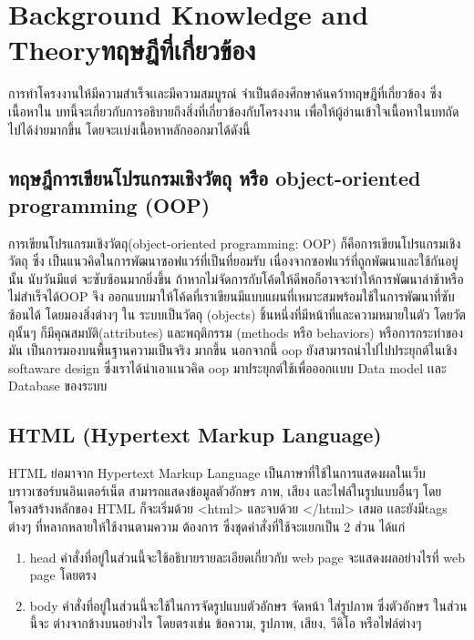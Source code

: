 \chapter{\ifenglish Background Knowledge and Theory\else ทฤษฎีที่เกี่ยวข้อง\fi}

การทําโครงงานให้มีความสําเร็จเเละมีความสมบูรณ์ จําเป็นต้องศึกษาค้นคว้าทฤษฎีที่เกี่ยวข้อง ซึ่งเนื้อหาใน
บทนี้จะเกี่ยวกับการอธิบายถึงสิ่งที่เกี่ยวข้องกับโครงงาน เพื่อให้ผู้อ่านเข้าใจเนื้อหาในบทถัดไปได้ง่ายมากขึ้น
โดยจะเเบ่งเนื้อหาหลักออกมาได้ดังนี้

\section{ทฤษฎีการเขียนโปรแกรมเชิงวัตถุ หรือ object-oriented programming (OOP)}
การเขียนโปรแกรมเชิงวัตถุ(object-oriented programming: OOP) ก็คือการเขียนโปรแกรมเชิงวัตถุ ซึ่ง
เป็นแนวคิดในการพัฒนาซอฟแวร์ที่เป็นที่ยอมรับ เนื่องจากซอฟแวร์ที่ถูกพัฒนาและใช้กันอยู่นั้น นับวันมีแต่
จะซับซ้อนมากยิ่งขึ้น ถ้าหากไม่จัดการกับโค้ดให้ดีพอก็อาจจะทําให้การพัฒนาล่าช้าหรือไม่สําเร็จได้OOP จึง
ออกแบบมาให้โค้ดที่เราเขียนมีแบบแผนที่เหมาะสมพร้อมใช้ในการพัฒนาที่ซับซ้อนได้ โดยมองสิ่งต่างๆ ใน
ระบบเป็นวัตถุ (objects) ชิ้นหนึ่งที่มีหน้าที่และความหมายในตัว โดยวัตถุนั้นๆ ก็มีคุณสมบัติ(attributes)
และพฤติกรรม (methods หรือ behaviors) หรือการกระทําของมัน เป็นการมองบนพื้นฐานความเป็นจริง
มากขึ้น นอกจากนี้ oop\cite{oop} ยังสามารถนําไปไปประยุกต์ในเชิง softaware design ซึ่งเราได้นําเอาเเนวคิด oop มาประยุกต์ใช้เพื่อออกเเบบ Data model เเละ Database ของระบบ

\section{HTML (Hypertext Markup Language)}
HTML\cite{html} ย่อมาจาก Hypertext Markup Language เป็นภาษาที่ใช้ในการแสดงผลในเว็บบราวเซอร์บนอินเตอร์เน็ต สามารถแสดงข้อมูลตัวอักษร ภาพ, เสียง และไฟล์ในรูปแบบอื่นๆ โดยโครงสร้างหลักของ HTML
ก็จะเริ่มด้วย <html> และจบด้วย </html> เสมอ เเละยังมีtags ต่างๆ ที่หลากหลายให้ใช้งานตามความ
ต้องการ ซึ่งชุดคําสั่งที่ใช้จะแยกเป็น 2 ส่วน ได้แก่
\begin{enumerate}
  \item head คําสั่งที่อยู่ในส่วนนี้จะใช้อธิบายรายละเอียดเกี่ยวกับ web page จะแสดงผลอย่างไรที่ web
  page โดยตรง
  \item body คําสั่งที่อยู่ในส่วนนี้จะใช้ในการจัดรูปแบบตัวอักษร จัดหน้า ใส่รูปภาพ ซึ่งตัวอักษร ในส่วนนี้จะ
  ต่างจากข้างบนอย่างไร โดยตรงเช่น ข้อความ, รูปภาพ, เสียง, วีดิโอ หรือไฟล์ต่างๆ  
\end{enumerate}

